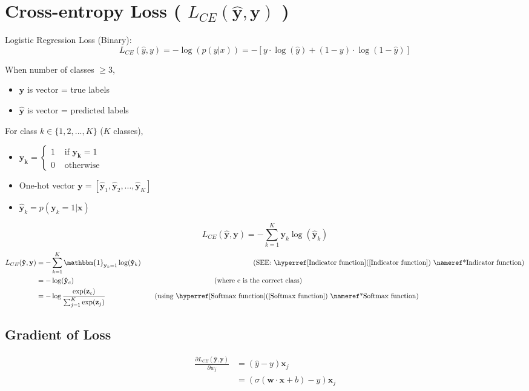 \section{Cross-entropy Loss ( $L_{CE}(\hat{\mathbf{y}},\mathbf{y})$ ) \cite{nlp-1}}

Logistic Regression Loss (Binary):
\[
    L_{CE}(\hat{y}, y) = -\log(p(y|x)) = -[y\cdot\log(\hat{y})+ (1-y)\cdot\log(1-\hat{y})]
\]

When number of classes $\geq 3$,
\begin{itemize}
    \item $\mathbf{y}$ is vector = true labels
    \item $\mathbf{\hat{y}}$ is vector = predicted labels
\end{itemize}

\vspace{0.3cm}
For class $k \in \{1,2,...,K\}$ ($K$ classes),
\begin{itemize}
    \item \(\mathbf{y_k} = \begin{cases}
        1 & \text{ if } \mathbf{y_k} = 1 \\
        0 & \text{ otherwise}
    \end{cases}\)
    \item One-hot vector $\mathbf{y} = [\mathbf{\hat{y}}_1, \mathbf{\hat{y}}_2, ..., \mathbf{\hat{y}}_K]$
    \item $\mathbf{\hat{y}}_k = p(\mathbf{y}_k = 1|\mathbf{x})$
\end{itemize}

\vspace{0.2cm}
\[
    L_{CE}(\mathbf{\hat{y}}, \mathbf{y}) = -\sum_{k=1}^{K} \mathbf{y}_k\log(\mathbf{\hat{y}}_k)
\]
\begin{align}
    L_{CE}(\mathbf{\hat{y}}, \mathbf{y}) &= -\sum_{k=1}^{K} \mathbbm{1}_{\mathbf{y}_k =1}\log(\mathbf{\hat{y}}_k) \notag
    \repeatn{16}{\quad} \text{(SEE: \fullref{Indicator function})}\\
    &= -\log(\mathbf{\hat{y}}_c)\notag \repeatn{20}{\quad} \text{(where c is the correct class)}\\
    &= -\log\displaystyle\frac{\exp(\mathbf{z}_c)}{\sum_{j=1}^{K} \exp(\mathbf{z}_j)} \notag \repeatn{7}{\quad} \text{(using \fullref{Softmax function})}
\end{align}


\subsection{Gradient of Loss}
\begin{align}
    \frac{\partial L_{CE}(\mathbf{\hat{y}}, \mathbf{y})}{\partial w_j} &= (\hat{y} - y) \mathbf{x}_j \\
    &= (\sigma(\mathbf{w} \cdot \mathbf{x} + b) - y) \mathbf{x}_j
\end{align}

